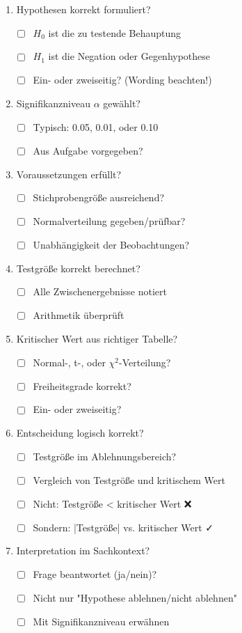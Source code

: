 \documentclass[10pt, a4paper, ngerman]{scrartcl}
\newcommand{\checkitem}[1]{\item[$\square$] #1}
\begin{document}
\begin{enumerate}
  \checkitem Hypothesen korrekt formuliert?
    \begin{itemize}
      \item[] ☐ $H_0$ ist die zu testende Behauptung
      \item[] ☐ $H_1$ ist die Negation oder Gegenhypothese
      \item[] ☐ Ein- oder zweiseitig? (Wording beachten!)
    \end{itemize}
  
  \checkitem Signifikanzniveau $\alpha$ gewählt?
    \begin{itemize}
      \item[] ☐ Typisch: 0.05, 0.01, oder 0.10
      \item[] ☐ Aus Aufgabe vorgegeben?
    \end{itemize}
  
  \checkitem Voraussetzungen erfüllt?
    \begin{itemize}
      \item[] ☐ Stichprobengröße ausreichend?
      \item[] ☐ Normalverteilung gegeben/prüfbar?
      \item[] ☐ Unabhängigkeit der Beobachtungen?
    \end{itemize}
  
  \checkitem Testgröße korrekt berechnet?
    \begin{itemize}
      \item[] ☐ Alle Zwischenergebnisse notiert
      \item[] ☐ Arithmetik überprüft
    \end{itemize}
  
  \checkitem Kritischer Wert aus richtiger Tabelle?
    \begin{itemize}
      \item[] ☐ Normal-, t-, oder $\chi^2$-Verteilung?
      \item[] ☐ Freiheitsgrade korrekt?
      \item[] ☐ Ein- oder zweiseitig?
    \end{itemize}
  
  \checkitem Entscheidung logisch korrekt?
    \begin{itemize}
      \item[] ☐ Testgröße im Ablehnungsbereich?
      \item[] ☐ Vergleich von Testgröße und kritischem Wert
      \item[] ☐ Nicht: Testgröße < kritischer Wert ❌
      \item[] ☐ Sondern: |Testgröße| vs. kritischer Wert ✓
    \end{itemize}
  
  \checkitem Interpretation im Sachkontext?
    \begin{itemize}
      \item[] ☐ Frage beantwortet (ja/nein)?
      \item[] ☐ Nicht nur "Hypothese ablehnen/nicht ablehnen"
      \item[] ☐ Mit Signifikanzniveau erwähnen
    \end{itemize}
\end{enumerate}
\end{document}

